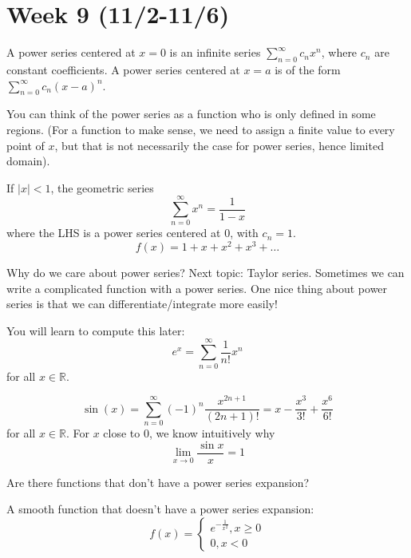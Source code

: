\documentclass[openany]{book}
\newcommand{\R}{\mathbb{R}}
\begin{document}
\section*{\centering Week 9 (11/2-11/6)}
\begin{defn}
    A power series centered at $x=0$ is an infinite series $\sum_{n=0}^\infty c_nx^n$, where $c_n$ are constant coefficients. A power series centered at $x=a$ is of the form $\sum_{n=0}^\infty c_n(x-a)^n$.
\end{defn}
You can think of the power series as a function who is only defined in some regions. (For a function to make sense, we need to assign a finite value to every point of $x$, but that is not necessarily the case for power series, hence limited domain).
\begin{example}
    If $|x|<1$, the geometric series 
    \begin{equation*}
        \sum_{n=0}^\infty x^n=\frac{1}{1-x}
    \end{equation*}
    where the LHS is a power series centered at $0$, with $c_n=1$.
    \begin{equation*}
        f(x)=1+x+x^2+x^3+\dots
    \end{equation*}
\end{example}
Why do we care about power series? Next topic: Taylor series. Sometimes we can write a complicated function with a power series. One nice thing about power series is that we can differentiate/integrate more easily!
\begin{example}
    You will learn to compute this later:
    \begin{equation*}
        e^x=\sum_{n=0}^\infty\frac{1}{n!}x^n
    \end{equation*}
    for all $x\in\R$.
\end{example}
\begin{example}
    \begin{equation*}
        \sin(x)=\sum_{n=0}^\infty(-1)^n\frac{x^{2n+1}}{(2n+1)!}=x-\frac{x^3}{3!}+\frac{x^6}{6!}
    \end{equation*}
    for all $x\in\R$. For $x$ close to $0$, we know intuitively why 
    \begin{equation*}
        \lim_{x\to 0}\frac{\sin x}{x}=1
    \end{equation*}
\end{example}
Are there functions that don't have a power series expansion?
\begin{example}
    A smooth function that doesn't have a power series expansion:
    \begin{equation*}
        f(x)=\begin{cases}
            e^{-\frac{1}{x^2}}, x\geq 0\\
            0, x<0
        \end{cases}
    \end{equation*}
\end{example}
\end{document}
